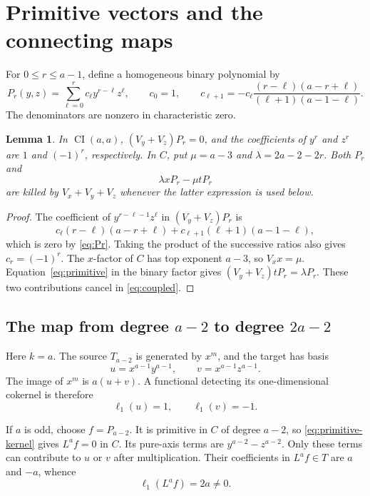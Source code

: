 \documentclass[11pt]{amsart}
\newtheorem{lemma}[theorem]{Lemma}
\theoremstyle{definition}
\newcommand{\CI}{\operatorname{CI}}
\begin{document}
\section{Primitive vectors and the connecting maps}

For $0\le r\le a-1$, define a homogeneous binary polynomial by
\begin{equation}\label{eq:Pr}
 P_r(y,z)=\sum_{\ell=0}^r c_\ell y^{r-\ell}z^\ell,
 \qquad c_0=1,\qquad
 c_{\ell+1}=-c_\ell
 \frac{(r-\ell)(a-r+\ell)}{(\ell+1)(a-1-\ell)}.
\end{equation}
The denominators are nonzero in characteristic zero.

\begin{lemma}\label{lem:Pr}
In $\CI(a,a)$, $(V_y+V_z)P_r=0$, and the coefficients of $y^r$ and
$z^r$ are $1$ and $(-1)^r$, respectively. In $C$, put
$\mu=a-3$ and $\lambda=2a-2-2r$. Both $P_r$ and
\begin{equation}\label{eq:coupled}
 \lambda xP_r-\mu tP_r
\end{equation}
are killed by $V_x+V_y+V_z$ whenever the latter expression is used below.
\end{lemma}

\begin{proof}
The coefficient of $y^{r-\ell-1}z^\ell$ in
$(V_y+V_z)P_r$ is
\[
 c_\ell(r-\ell)(a-r+\ell)
 +c_{\ell+1}(\ell+1)(a-1-\ell),
\]
which is zero by \eqref{eq:Pr}. Taking the product of the successive
ratios also gives $c_r=(-1)^r$. The $x$-factor of $C$ has top exponent
$a-3$, so $V_xx=\mu$. Equation~\eqref{eq:primitive} in the binary
factor gives $(V_y+V_z)tP_r=\lambda P_r$.
These two contributions cancel in \eqref{eq:coupled}.
\end{proof}

\subsection{\texorpdfstring{The map from degree $a-2$ to degree $2a-2$}{The first connecting map}}

Here $k=a$. The source $T_{a-2}$ is generated by $x^m$, and the target
has basis
\[
 u=x^{a-1}y^{a-1},\qquad v=x^{a-1}z^{a-1}.
\]
The image of $x^m$ is $a(u+v)$. A functional detecting its
one-dimensional cokernel is therefore
\[
 \ell_1(u)=1,\qquad \ell_1(v)=-1.
\]

If $a$ is odd, choose $f=P_{a-2}$. It is primitive in $C$ of degree
$a-2$, so \eqref{eq:primitive-kernel} gives $L^af=0$ in $C$.
Its pure-axis terms are $y^{a-2}-z^{a-2}$.
Only these terms can contribute to $u$ or $v$ after multiplication.
Their coefficients in $L^af\in T$ are $a$ and $-a$, whence
\begin{equation}\label{eq:delta1odd}
 \ell_1(L^af)=2a\ne0.
\end{equation}
\end{document}
